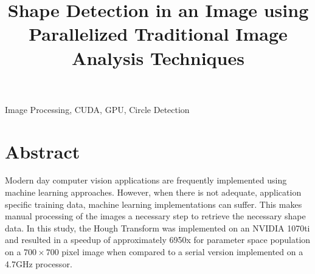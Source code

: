 \documentclass[conference]{IEEEtran}
\begin{document}
\title{Shape Detection in an Image using Parallelized Traditional Image Analysis Techniques\\
}

\author{
\and
}

\maketitle


\begin{IEEEkeywords}
Image Processing, CUDA, GPU, Circle Detection
\end{IEEEkeywords}

\section{Abstract}
Modern day computer vision applications are frequently implemented using machine learning approaches.
However, when there is not adequate, application specific training data, machine learning implementations can suffer.
This makes manual processing of the images a necessary step to retrieve the necessary shape data.
In this study, the Hough Transform was implemented on an NVIDIA 1070ti and resulted in a speedup of approximately 6950x for parameter space population on a $700 \times 700$ pixel image when compared to a serial version implemented on a 4.7GHz processor. 

\end{document}
